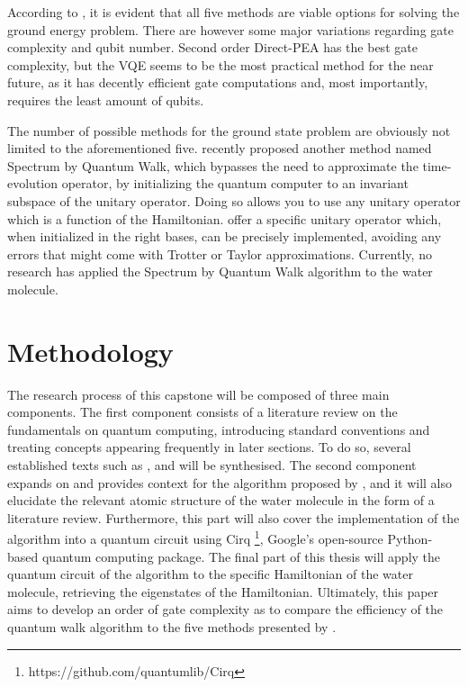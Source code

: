 \documentclass{article}
\begin{document}
According to \textcite{bian}, it is evident that all five methods are viable options for solving the ground energy problem. There are however some major variations regarding gate complexity and qubit number. Second order Direct-PEA has the best gate complexity, but the VQE seems to be the most practical method for the near future, as it has decently efficient gate computations and, most importantly, requires the least amount of qubits.


The number of possible methods for the ground state problem are obviously not limited to the aforementioned five. \textcite{poulin} recently proposed another method named Spectrum by Quantum Walk, which bypasses the need to approximate the time-evolution operator, by initializing the quantum computer to an invariant subspace of the unitary operator. Doing so allows you to use any unitary operator which is a function of the Hamiltonian. \textcite{poulin} offer a specific unitary operator which, when initialized in the right bases, can be precisely implemented, avoiding any errors that might come with Trotter or Taylor approximations. Currently, no research has applied the Spectrum by Quantum Walk algorithm to the water molecule.
\section{Methodology}


The research process of this capstone will be composed of three main components. The first component consists of a literature review on the fundamentals on quantum computing, introducing standard conventions and treating concepts appearing frequently in later sections. To do so, several established texts such as \textcite{nielsen}, \textcite{steane} and \textcite{Divincenzo} will be synthesised. The second component expands on and provides context for the algorithm proposed by \textcite{poulin}, and it will also elucidate the relevant atomic structure of the water molecule in the form of a literature review. Furthermore, this part will also cover the implementation of the algorithm into a quantum circuit using Cirq \footnote{https://github.com/quantumlib/Cirq}, Google's open-source Python-based quantum computing package. The final part of this thesis will apply the quantum circuit of the algorithm to the specific Hamiltonian of the water molecule, retrieving the eigenstates of the Hamiltonian. Ultimately, this paper aims to develop an order of gate complexity as to compare the efficiency of the quantum walk algorithm to the five methods presented by \textcite{poulin}.
\end{document}
